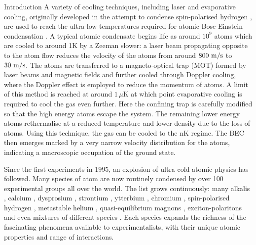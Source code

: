\begin{chapter}{\label{cha:bose_gases}Introduction}
A variety of cooling techniques, including laser \cite{billphillips,chu98,Cohen-Tannoudji} and evaporative \cite{PhysRevB.34.3476} cooling, originally developed in the attempt to condense spin-polarised hydrogen \cite{Hecht59, PhysRevLett.44.164, Silvera86}, are used to reach the ultra-low temperatures required for atomic Bose-Einstein condensation \cite{Pethick,RevModPhys.74.1131,RevModPhys.74.875}. A typical atomic condensate begins life as around $10^9$ atoms which are cooled to around 1K by a Zeeman slower: a laser beam propagating opposite to the atom flow reduces the velocity of the atoms from around $800~\rm{m/s}$ to $30~\rm{m/s}$. The atoms are transferred to a magneto-optical trap (MOT) formed by laser beams and magnetic fields and further cooled through Doppler cooling, where the Doppler effect is employed to reduce the momentum of atoms. A limit of this method is reached at around $1\,\mu$K \cite{Pethick} at which point evaporative cooling is required to cool the gas even further. Here the confining trap is carefully modified so that the high energy atoms escape the system. The remaining lower energy atoms rethermalise at a reduced temperature and lower density due to the loss of atoms. Using this technique, the gas can be cooled to the nK regime. The BEC then emerges marked by a very narrow velocity distribution for the atoms, indicating a macroscopic occupation of the ground state. 

Since the first experiments in 1995, an explosion of ultra-cold atomic physics has followed. Many species of atom are now routinely condensed by over 100 experimental groups all over the world. The list grows continuously: many alkalis \cite{Anderson198,PhysRevLett.75.3969,PhysRevLett.75.1687,PhysRevLett.78.985,PhysRevLett.85.1795,Modugno,Robert461,Weber232}, calcium \cite{PhysRevLett.103.130401}, dysprosium \cite{PhysRevLett.107.190401}, strontium \cite{PhysRevLett.103.200401,PhysRevLett.103.200402, PhysRevA.82.041602, PhysRevA.81.051601}, ytterbium \cite{PhysRevLett.91.040404}, chromium \cite{PhysRevLett.94.160401}, spin-polarised hydrogen \cite{PhysRevLett.81.3811}, metastable helium \cite{PhysRevLett.86.3459}, quasi-equilibrium magnons \cite{Mathew11}, exciton-polaritons \cite{Kasprzak06} and even mixtures of different species \cite{PhysRevLett.89.053202, PhysRevLett.89.190404, PhysRevLett.100.210402,PhysRevA.84.011603}. Each species expands the richness of the fascinating phenomena available to experimentalists, with their unique atomic properties and range of interactions.


\end{chapter}
